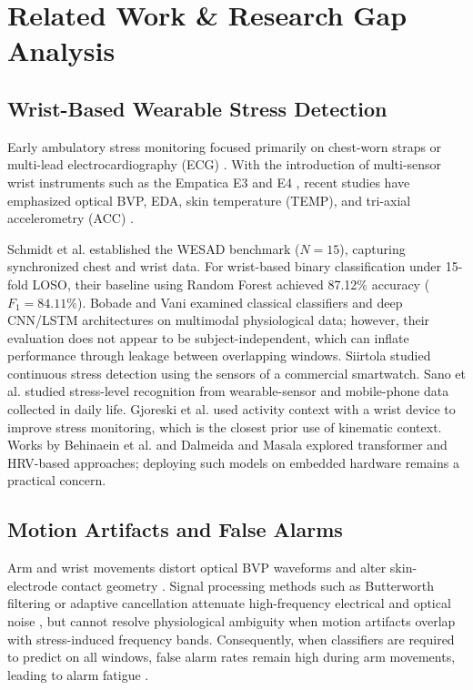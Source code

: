 \documentclass[conference]{IEEEtran}
\begin{document}
\section{Related Work \& Research Gap Analysis}

\subsection{Wrist-Based Wearable Stress Detection}
Early ambulatory stress monitoring focused primarily on chest-worn straps or multi-lead electrocardiography (ECG) \cite{taskforce1996heart}. With the introduction of multi-sensor wrist instruments such as the Empatica E3 and E4 \cite{garbarino2014empatica, mccarthy2016validation}, recent studies have emphasized optical BVP, EDA, skin temperature (TEMP), and tri-axial accelerometry (ACC) \cite{can2019stress, gjoreski2016continuous}.

Schmidt et al. \cite{schmidt2018wesad} established the WESAD benchmark ($N=15$), capturing synchronized chest and wrist data. For wrist-based binary classification under 15-fold LOSO, their baseline using Random Forest achieved 87.12\% accuracy ($F_1 = 84.11\%$). Bobade and Vani \cite{bobade2020stress} examined classical classifiers and deep CNN/LSTM architectures on multimodal physiological data; however, their evaluation does not appear to be subject-independent, which can inflate performance through leakage between overlapping windows. Siirtola \cite{siirtola2019continuous} studied continuous stress detection using the sensors of a commercial smartwatch. Sano et al. \cite{sano2015recognizing} studied stress-level recognition from wearable-sensor and mobile-phone data collected in daily life. Gjoreski et al. \cite{gjoreski2017monitoring} used activity context with a wrist device to improve stress monitoring, which is the closest prior use of kinematic context. Works by Behinaein et al. \cite{behinaein2021transformer} and Dalmeida and Masala \cite{dalmeida2021hrv} explored transformer and HRV-based approaches; deploying such models on embedded hardware remains a practical concern.

\subsection{Motion Artifacts and False Alarms}
Arm and wrist movements distort optical BVP waveforms and alter skin-electrode contact geometry \cite{tamura2014wearable, zhang2014troika, schumm2008effect, taylor2015automatic, kleckner2018simple, elgendi2016optimal}. Signal processing methods such as Butterworth filtering or adaptive cancellation attenuate high-frequency electrical and optical noise \cite{zhang2014troika}, but cannot resolve physiological ambiguity when motion artifacts overlap with stress-induced frequency bands. Consequently, when classifiers are required to predict on all windows, false alarm rates remain high during arm movements, leading to alarm fatigue \cite{sendelbach2013alarm}.
\end{document}
